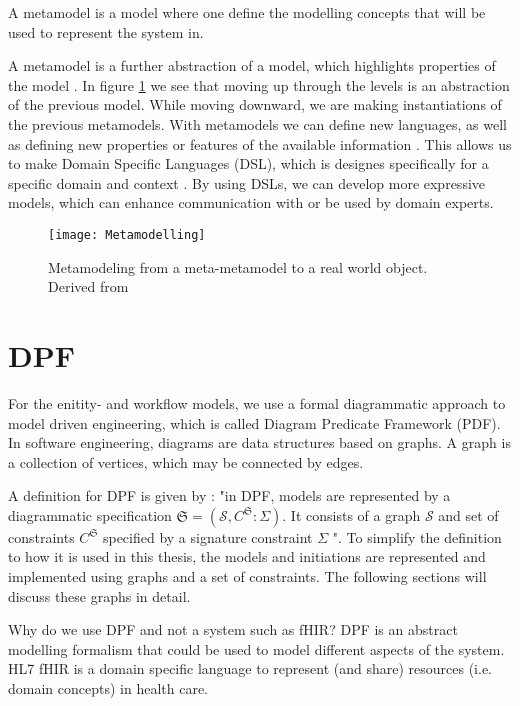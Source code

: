 A metamodel is a model where one define the modelling concepts that will be used to represent the system in.

A metamodel is a further abstraction of a model, which highlights properties of the model \parencite{Brambilla2017}. In figure \ref{fig:Metamodelling} we see that moving up through the levels is an abstraction of the previous model. While moving downward, we are making instantiations of the previous metamodels. With metamodels we can define new languages, as well as defining new properties or features of the available information \parencite{Brambilla2017}. This allows us to make Domain Specific Languages (DSL), which is designes specifically for a specific domain and context \parencite{Brambilla2017}\parencite{RodriguesdaSilva2015}. By using DSLs, we can develop more expressive models, which can enhance communication with or be used by domain experts. 

\begin{figure}[h!]
	\texttt{[image: Metamodelling]}
	\caption{Metamodeling from a meta-metamodel to a real world object. Derived from \parencite{Brambilla2017}}
	\label{fig:Metamodelling}
\end{figure}

\section{DPF}
For the enitity- and workflow models, we use a formal diagrammatic approach to model driven engineering, which is called Diagram Predicate Framework (PDF). In software engineering, diagrams are data structures based on graphs. A graph is a collection of vertices, which may be connected by edges.

A definition for DPF is given by \textcite{Rutle2010}: "in DPF, models are represented by a diagrammatic specification \(\mathfrak{S} = ({\mathcal{S}}, C^{\mathfrak{S}} : \Sigma)\). It consists of a graph \(\mathcal{S}\) and set of constraints \(C^{\mathfrak{S}}\) specified by a signature constraint $\Sigma$ ". To simplify the definition to how it is used in this thesis, the models and initiations are represented and implemented using graphs and a set of constraints. The following sections will discuss these graphs in detail.

Why do we use DPF and not a system such as fHIR? DPF is an abstract modelling formalism that could be used to model different aspects of the system. HL7 fHIR is a domain specific language to represent (and share) resources (i.e. domain concepts) in health care. 
